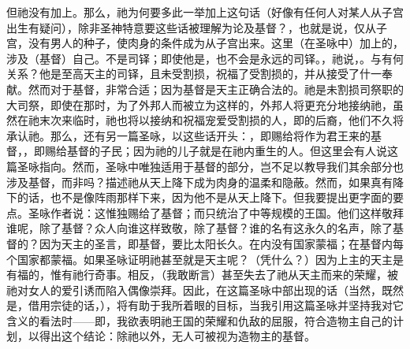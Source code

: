 但祂没有加上。那么，祂为何要多此一举加上这句话（好像有任何人对某人从子宫出生有疑问），除非圣神特意要这些话被理解为论及基督？，也就是说，仅从子宫，没有男人的种子，使肉身的条件成为从子宫出来。这里（在圣咏中）加上的，涉及（基督）自己。不是司铎；即使他是，也不会是永远的司铎。，祂说，。与有何关系？他是至高天主的司铎，且未受割损，祝福了受割损的，并从接受了什一奉献。然而对于基督，非常合适；因为基督是天主正确合法的。祂是未割损司祭职的大司祭，即使在那时，为了外邦人而被立为这样的，外邦人将更充分地接纳祂，虽然在祂末次来临时，祂也将以接纳和祝福宠爱受割损的人，即的后裔，他们不久将承认祂。那么，还有另一篇圣咏，以这些话开头：，即赐给将作为君王来的基督，，即赐给基督的子民；因为祂的儿子就是在祂内重生的人。但这里会有人说这篇圣咏指向。然而，圣咏中唯独适用于基督的部分，岂不足以教导我们其余部分也涉及基督，而非吗？描述祂从天上降下成为肉身的温柔和隐蔽。然而，如果真有降下的话，也不是像阵雨那样下来，因为他不是从天上降下。但我要提出更字面的要点。圣咏作者说：这惟独赐给了基督；而只统治了中等规模的王国。他们这样敬拜谁呢，除了基督？众人向谁这样致敬，除了基督？谁的名有这永久的名声，除了基督的？因为天主的圣言，即基督，要比太阳长久。在内没有国家蒙福；在基督内每个国家都蒙福。如果圣咏证明祂甚至就是天主呢？（凭什么？）因为上主的天主是有福的，惟有祂行奇事。相反，（我敢断言）甚至失去了祂从天主而来的荣耀，被祂对女人的爱引诱而陷入偶像崇拜。因此，在这篇圣咏中部出现的话（当然，既然是，借用宗徒的话，），将有助于我所着眼的目标，当我引用这篇圣咏并坚持我对它含义的看法时——即，我欲表明祂王国的荣耀和仇敌的屈服，符合造物主自己的计划，以得出这个结论：除祂以外，无人可被视为造物主的基督。\par


